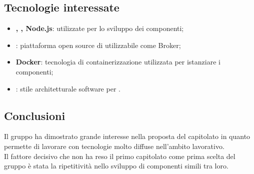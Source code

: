 \subsection{Tecnologie interessate}
\begin{itemize}
    \item \textbf{, , Node.js}: utilizzate per lo sviluppo dei componenti;
    \item \textbf{}: piattaforma open source di  utilizzabile come Broker;
    \item \textbf{Docker}: tecnologia di containerizzazione utilizzata per istanziare i componenti;
    \item \textbf{}: stile architetturale software per .
\end{itemize}   

\subsection{Conclusioni}
Il gruppo ha dimostrato grande interesse nella proposta del capitolato in quanto permette di lavorare con tecnologie molto diffuse nell’ambito lavorativo.
\\Il fattore decisivo che non ha reso il primo capitolato come prima scelta del gruppo è stata la ripetitività nello sviluppo di componenti simili tra loro.

